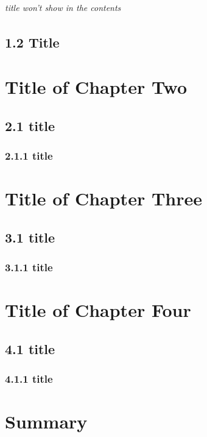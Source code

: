 \documentclass[a4paper,12pt,UTF8,openright]{book}
\begin{document}
\subparagraph{title won't show in the contents}
\lipsum[1-5]

\section{1.2 Title}
\lipsum[1-5]

\chapter{Title of Chapter Two}
\lipsum[1-5]

\section{2.1 title}
\lipsum[1-5]

\subsection{2.1.1 title}
\lipsum[1-5]

\chapter{Title of Chapter Three}
\lipsum[1-5]

\section{3.1 title}
\lipsum[1-5]

\subsection{3.1.1 title}
\lipsum[1-5]

\chapter{Title of Chapter Four}
\lipsum[1-5]

\section{4.1 title}
\lipsum[1-5]

\subsection{4.1.1 title}
\lipsum[1-5]

\chapter{Summary}
\lipsum[1-5]
\end{document}

